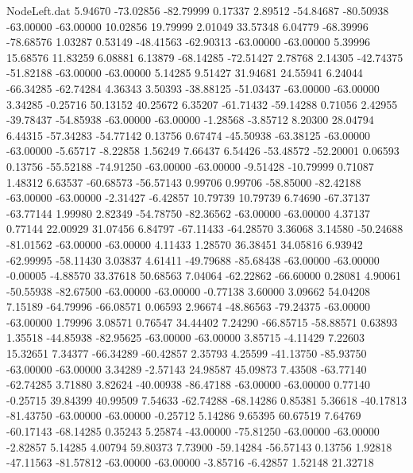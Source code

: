 \begin{filecontents}{NodeLeft.dat}
   5.94670  -73.02856  -82.79999     0.17337    2.89512  -54.84687  -80.50938  -63.00000  -63.00000   10.02856   19.79999    2.01049   33.57348
   6.04779  -68.39996  -78.68576     1.03287    0.53149  -48.41563  -62.90313  -63.00000  -63.00000    5.39996   15.68576   11.83259    6.08881
   6.13879  -68.14285  -72.51427     2.78768    2.14305  -42.74375  -51.82188  -63.00000  -63.00000    5.14285    9.51427   31.94681   24.55941
   6.24044  -66.34285  -62.74284     4.36343    3.50393  -38.88125  -51.03437  -63.00000  -63.00000    3.34285   -0.25716   50.13152   40.25672
   6.35207  -61.71432  -59.14288     0.71056    2.42955  -39.78437  -54.85938  -63.00000  -63.00000   -1.28568   -3.85712    8.20300   28.04794
   6.44315  -57.34283  -54.77142     0.13756    0.67474  -45.50938  -63.38125  -63.00000  -63.00000   -5.65717   -8.22858    1.56249    7.66437
   6.54426  -53.48572  -52.20001     0.06593    0.13756  -55.52188  -74.91250  -63.00000  -63.00000   -9.51428  -10.79999    0.71087    1.48312
   6.63537  -60.68573  -56.57143     0.99706    0.99706  -58.85000  -82.42188  -63.00000  -63.00000   -2.31427   -6.42857   10.79739   10.79739
   6.74690  -67.37137  -63.77144     1.99980    2.82349  -54.78750  -82.36562  -63.00000  -63.00000    4.37137    0.77144   22.00929   31.07456
   6.84797  -67.11433  -64.28570     3.36068    3.14580  -50.24688  -81.01562  -63.00000  -63.00000    4.11433    1.28570   36.38451   34.05816
   6.93942  -62.99995  -58.11430     3.03837    4.61411  -49.79688  -85.68438  -63.00000  -63.00000   -0.00005   -4.88570   33.37618   50.68563
   7.04064  -62.22862  -66.60000     0.28081    4.90061  -50.55938  -82.67500  -63.00000  -63.00000   -0.77138    3.60000    3.09662   54.04208
   7.15189  -64.79996  -66.08571     0.06593    2.96674  -48.86563  -79.24375  -63.00000  -63.00000    1.79996    3.08571    0.76547   34.44402
   7.24290  -66.85715  -58.88571     0.63893    1.35518  -44.85938  -82.95625  -63.00000  -63.00000    3.85715   -4.11429    7.22603   15.32651
   7.34377  -66.34289  -60.42857     2.35793    4.25599  -41.13750  -85.93750  -63.00000  -63.00000    3.34289   -2.57143   24.98587   45.09873
   7.43508  -63.77140  -62.74285     3.71880    3.82624  -40.00938  -86.47188  -63.00000  -63.00000    0.77140   -0.25715   39.84399   40.99509
   7.54633  -62.74288  -68.14286     0.85381    5.36618  -40.17813  -81.43750  -63.00000  -63.00000   -0.25712    5.14286    9.65395   60.67519
   7.64769  -60.17143  -68.14285     0.35243    5.25874  -43.00000  -75.81250  -63.00000  -63.00000   -2.82857    5.14285    4.00794   59.80373
   7.73900  -59.14284  -56.57143     0.13756    1.92818  -47.11563  -81.57812  -63.00000  -63.00000   -3.85716   -6.42857    1.52148   21.32718

\end{filecontents}
